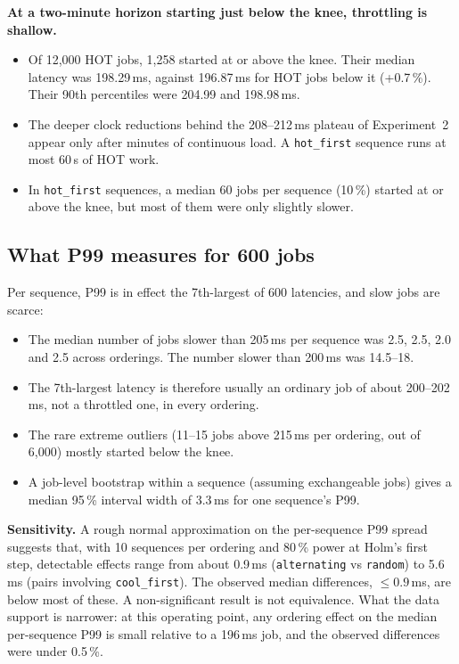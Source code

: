 \documentclass[conference,a4paper]{IEEEtran}
\newcommand{\code}[1]{\texttt{#1}}
\begin{document}
\textbf{At a two-minute horizon starting just below the knee, throttling is shallow.}
\begin{itemize}
\item Of 12{,}000 HOT jobs, 1{,}258 started at or above the knee. Their median latency was 198.29\,ms, against
196.87\,ms for HOT jobs below it (+0.7\,\%). Their 90th percentiles were 204.99 and 198.98\,ms.
\item The deeper clock reductions behind the 208--212\,ms plateau of Experiment~2 appear only after minutes of
continuous load. A \code{hot\_first} sequence runs at most 60\,s of HOT work.
\item In \code{hot\_first} sequences, a median 60 jobs per sequence (10\,\%) started at or above the knee, but most
of them were only slightly slower.
\end{itemize}

\subsection{What P99 measures for 600 jobs}\label{sec:p99}
Per sequence, P99 is in effect the 7th-largest of 600 latencies, and slow jobs are scarce:
\begin{itemize}
\item The median number of jobs slower than 205\,ms per sequence was 2.5, 2.5, 2.0 and 2.5 across orderings. The
number slower than 200\,ms was 14.5--18.
\item The 7th-largest latency is therefore usually an ordinary job of about 200--202\,ms, not a throttled one, in
every ordering.
\item The rare extreme outliers (11--15 jobs above 215\,ms per ordering, out of 6{,}000) mostly started below the
knee.
\item A job-level bootstrap within a sequence (assuming exchangeable jobs) gives a median 95\,\% interval width of
3.3\,ms for one sequence's P99.
\end{itemize}

\textbf{Sensitivity.} A rough normal approximation on the per-sequence P99 spread suggests that, with 10 sequences
per ordering and 80\,\% power at Holm's first step, detectable effects range from about 0.9\,ms
(\code{alternating} vs \code{random}) to 5.6\,ms (pairs involving \code{cool\_first}). The observed median
differences, $\le0.9$\,ms, are below most of these. A non-significant result is not equivalence. What the data
support is narrower: at this operating point, any ordering effect on the median per-sequence P99 is small relative
to a 196\,ms job, and the observed differences were under 0.5\,\%.
\end{document}

